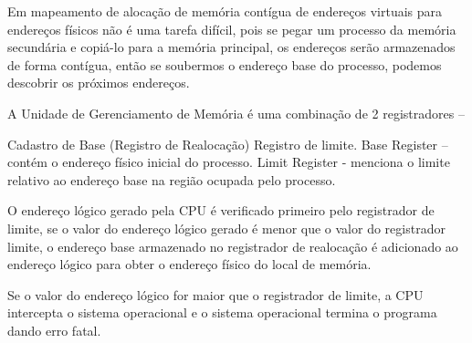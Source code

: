 \begin{question}

  Em mapeamento de alocação de memória contígua de endereços virtuais para endereços físicos não é uma tarefa difícil, pois se
  pegar um processo da memória secundária e copiá-lo para a memória principal, os endereços serão armazenados de forma contígua,
  então se soubermos o endereço base do processo, podemos descobrir os próximos endereços.

  A Unidade de Gerenciamento de Memória é uma combinação de 2 registradores –
  
  Cadastro de Base (Registro de Realocação)
  Registro de limite.
  Base Register – contém o endereço físico inicial do processo.
  Limit Register - menciona o limite relativo ao endereço base na região ocupada pelo processo.
  
  O endereço lógico gerado pela CPU é verificado primeiro pelo registrador de limite, se o valor do endereço lógico
  gerado é menor que o valor do registrador limite, o endereço base armazenado no registrador de realocação é adicionado
  ao endereço lógico para obter o endereço físico do local de memória.
  
  Se o valor do endereço lógico for maior que o registrador de limite, a CPU intercepta o sistema operacional e o sistema operacional termina
  o programa dando erro fatal.
\end{question}
